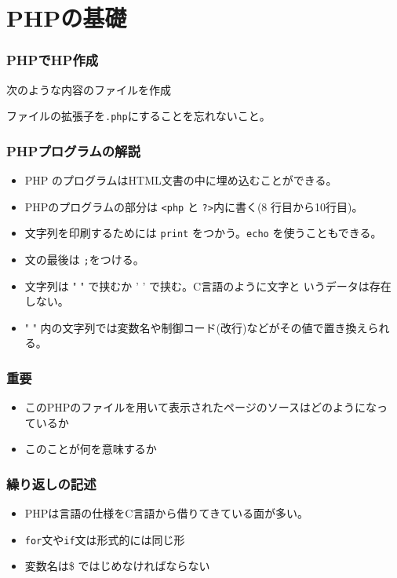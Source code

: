 

\frame{\maketitle}
\section{PHPの基礎}
\begin{frame}[containsverbatim]
 \frametitle{PHPでHP作成}
 次のような内容のファイルを作成

 ファイルの拡張子を\texttt{.php}にすることを忘れないこと。
\end{frame}
\begin{frame}[containsverbatim]
 \frametitle{PHPプログラムの解説}
\begin{itemize}
 \item PHP のプログラムはHTML文書の中に埋め込むことができる。
 \item PHPのプログラムの部分は \Verb+<php+ と \Verb+?>+内に書く(8
       行目から10行目)。
 \item 文字列を印刷するためには \texttt{print} をつかう。\texttt{echo}
       を使うこともできる。
 \item 文の最後は \texttt{;}をつける。
 \item  文字列は " " で挟むか ' ' で挟む。C言語のように文字と
        いうデータは存在しない。
 \item  " " 内の文字列では変数名や制御コード(改行)などがその値で置き換えられる。
\end{itemize}
\end{frame}
\begin{frame}[containsverbatim]
\frametitle{重要}
 \begin{itemize}
  \item このPHPのファイルを用いて表示されたページのソースはどのようになっ
 ているか
  \item このことが何を意味するか
 \end{itemize}
\end{frame}
\begin{frame}[containsverbatim]
 \frametitle{繰り返しの記述}
 \begin{itemize}
  \item PHPは言語の仕様をC言語から借りてきている面が多い。
  \item \texttt{for}文や\texttt{if}文は形式的には同じ形
  \item 変数名は\$ ではじめなければならない
 \end{itemize}
\end{frame}
